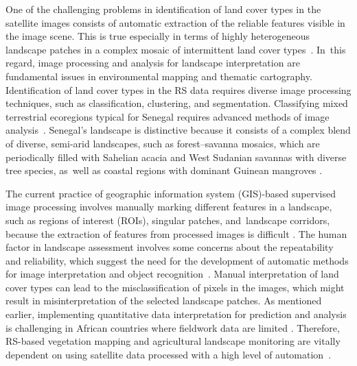 \documentclass[earth,article,accept,pdftex,moreauthors]{Definitions/mdpi}
\begin{document}
One of the challenging {problems} in identification of land cover types in the satellite images consists of automatic extraction of the reliable features {visible in the }image scene{. This is true especially in terms of }highly heterogeneous landscape patches in a complex mosaic of intermittent land cover types~\cite{CAMPOS2018211,SYIFA2020919}. In~this regard, image processing and analysis for landscape interpretation {are} fundamental {issues} in environmental mapping and thematic cartography. Identification of land cover types in the {RS data} requires diverse image processing techniques, such as classification, clustering, and segmentation. {Classifying} mixed terrestrial ecoregions {typical for} Senegal requires {advanced methods of} image \mbox{analysis~\cite{BUDDE2004481}}. {Senegal's} landscape is distinctive because {it consists of} a complex {blend} of diverse, semi-arid landscapes, such as forest--savanna mosaics, {which are periodically filled} with Sahelian acacia and West Sudanian {savannas} with diverse tree species, as~well as coastal regions with {dominant} Guinean {mangroves}
\cite{TAPPAN2004427,DEANS2003253}.

{The current practice {of geographic information system (GIS)-based supervised image processing }involves manually marking different} features in {a{ }landscape, such as} regions of interest (ROIs), singular patches, and~landscape corridors, {because} the {extraction of features from processed images is difficult}
 \cite{CABRAL2017115}. {The} human factor in landscape {assessment} {involves }some concerns {about} {the }repeatability and reliability, which {suggest} the need for the development of automatic methods {for} image interpretation and {object} recognition~\cite{CONCHEDDA2008578,rs9020181,rs12091436}. {Manual interpretation of} land cover types can {lead to the} misclassification of pixels in the images, which {might }{result in} misinterpretation of {the }selected landscape patches. {As mentioned earlier, implementing quantitative} data interpretation for prediction and analysis {is challenging} in African countries {where fieldwork} data {are limited }\cite{STOORVOGEL2009161}. Therefore, {RS}{-based vegetation mapping and agricultural landscape monitoring are vitally dependent} on using satellite data processed with a high level of automation~\cite{PEREZHOYOS2020102064,BRANDT2016215}.  
\end{document}
